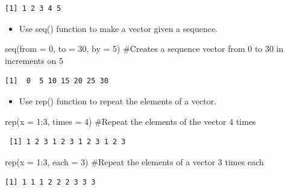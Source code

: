 \documentclass[
  letterpaper,
  DIV=11,
  numbers=noendperiod]{scrreprt}
\newenvironment{Shaded}{\begin{snugshade}}{\end{snugshade}}
\newcommand{\AttributeTok}[1]{\textcolor[rgb]{0.40,0.45,0.13}{#1}}
\newcommand{\CommentTok}[1]{\textcolor[rgb]{0.37,0.37,0.37}{#1}}
\newcommand{\DecValTok}[1]{\textcolor[rgb]{0.68,0.00,0.00}{#1}}
\newcommand{\FunctionTok}[1]{\textcolor[rgb]{0.28,0.35,0.67}{#1}}
\newcommand{\NormalTok}[1]{\textcolor[rgb]{0.00,0.23,0.31}{#1}}
\newcommand{\SpecialCharTok}[1]{\textcolor[rgb]{0.37,0.37,0.37}{#1}}
\providecommand{\tightlist}{%
  \setlength{\itemsep}{0pt}\setlength{\parskip}{0pt}}\usepackage{longtable,booktabs,array}
\begin{document}
\begin{verbatim}
[1] 1 2 3 4 5
\end{verbatim}

\begin{itemize}
\tightlist
\item
  Use seq() function to make a vector given a sequence.
\end{itemize}

\begin{Shaded}
\begin{Highlighting}[]
\FunctionTok{seq}\NormalTok{(}\AttributeTok{from =} \DecValTok{0}\NormalTok{, }\AttributeTok{to =} \DecValTok{30}\NormalTok{, }\AttributeTok{by =} \DecValTok{5}\NormalTok{)  }\CommentTok{\#Creates a sequence vector from 0 to 30 in increments on 5 }
\end{Highlighting}
\end{Shaded}

\begin{verbatim}
[1]  0  5 10 15 20 25 30
\end{verbatim}

\begin{itemize}
\tightlist
\item
  Use rep() function to repeat the elements of a vector.
\end{itemize}

\begin{Shaded}
\begin{Highlighting}[]
\FunctionTok{rep}\NormalTok{(}\AttributeTok{x =} \DecValTok{1}\SpecialCharTok{:}\DecValTok{3}\NormalTok{, }\AttributeTok{times =} \DecValTok{4}\NormalTok{)  }\CommentTok{\#Repeat the elements of the vector 4 times}
\end{Highlighting}
\end{Shaded}

\begin{verbatim}
 [1] 1 2 3 1 2 3 1 2 3 1 2 3
\end{verbatim}

\begin{Shaded}
\begin{Highlighting}[]
\FunctionTok{rep}\NormalTok{(}\AttributeTok{x =} \DecValTok{1}\SpecialCharTok{:}\DecValTok{3}\NormalTok{, }\AttributeTok{each =} \DecValTok{3}\NormalTok{)  }\CommentTok{\#Repeat the elements of a vector 3 times each}
\end{Highlighting}
\end{Shaded}

\begin{verbatim}
[1] 1 1 1 2 2 2 3 3 3
\end{verbatim}
\end{document}
